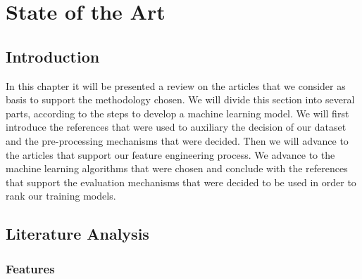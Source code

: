 



\chapter{State of the Art}
\label{cha:introduction}


\section{Introduction} 
\label{sub:if_you_use_this_template} 

In this chapter it will be presented a review on the articles that we consider as basis to support the methodology chosen. We will divide this section into several parts, according to the steps to develop a machine learning model.
We will first introduce the references that were used to auxiliary the decision of our dataset and the pre-processing mechanisms that were decided. Then we will advance to the articles that support our feature engineering process. We advance to the machine learning algorithms that were chosen and conclude with the references that support the evaluation mechanisms that were decided to be used in order to rank our training models.

\section{Literature Analysis}

\subsection{Features}

